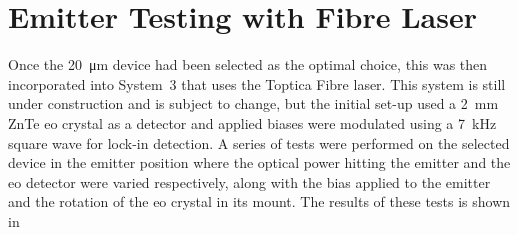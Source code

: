 \section{Emitter Testing with Fibre Laser}
\label{sec:fibrelaser}
Once the \SI{20}{\micro\metre} device had been selected as the optimal choice, this was then incorporated into System~3 that uses the Toptica Fibre laser. This system is still under construction and is subject to change, but the initial set\nobreakdash-up used a \SI{2}{mm} ZnTe \acrshort{eo} crystal as a detector and applied biases were modulated using a \SI{7}{kHz} square wave for lock\nobreakdash-in detection. A series of tests were performed on the selected device in the emitter position where the optical power hitting the emitter and the \acrshort{eo} detector were varied respectively, along with the bias applied to the emitter and the rotation of the \acrshort{eo} crystal in its mount. The results of these tests is shown in 

